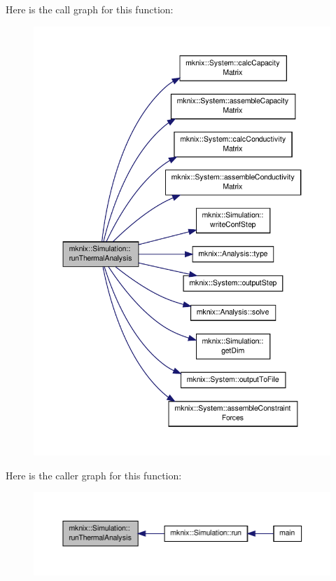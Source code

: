 Here is the call graph for this function\-:\nopagebreak
\begin{figure}[H]
\begin{center}
\leavevmode
\includegraphics[width=350pt]{db/d0b/classmknix_1_1_simulation_ae769b1ff16dc5eada23b3aae69da8168_cgraph}
\end{center}
\end{figure}




Here is the caller graph for this function\-:\nopagebreak
\begin{figure}[H]
\begin{center}
\leavevmode
\includegraphics[width=350pt]{db/d0b/classmknix_1_1_simulation_ae769b1ff16dc5eada23b3aae69da8168_icgraph}
\end{center}
\end{figure}


